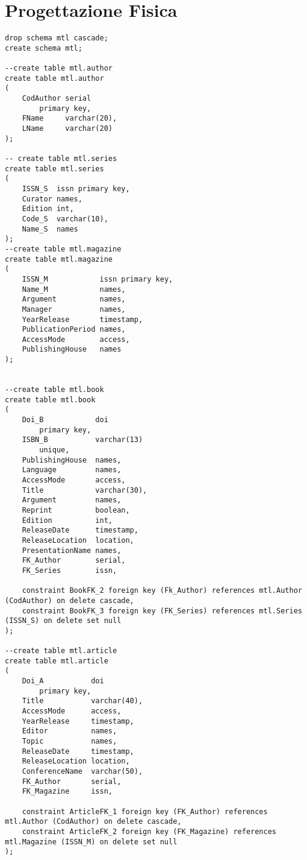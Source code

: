 \chapter{Progettazione Fisica}

\begin{lstlisting}
drop schema mtl cascade;
create schema mtl;

--create table mtl.author
create table mtl.author
(
    CodAuthor serial
        primary key,
    FName     varchar(20),
    LName     varchar(20)
);

-- create table mtl.series
create table mtl.series
(
    ISSN_S  issn primary key,
    Curator names,
    Edition int,
    Code_S  varchar(10),
    Name_S  names
);
--create table mtl.magazine
create table mtl.magazine
(
    ISSN_M            issn primary key,
    Name_M            names,
    Argument          names,
    Manager           names,
    YearRelease       timestamp,
    PublicationPeriod names,
    AccessMode        access,
    PublishingHouse   names
);


--create table mtl.book
create table mtl.book
(
    Doi_B            doi
        primary key,
    ISBN_B           varchar(13)
        unique,
    PublishingHouse  names,
    Language         names,
    AccessMode       access,
    Title            varchar(30),
    Argument         names,
    Reprint          boolean,
    Edition          int,
    ReleaseDate      timestamp,
    ReleaseLocation  location,
    PresentationName names,
    FK_Author        serial,
    FK_Series        issn,

    constraint BookFK_2 foreign key (Fk_Author) references mtl.Author (CodAuthor) on delete cascade,
    constraint BookFK_3 foreign key (FK_Series) references mtl.Series (ISSN_S) on delete set null
);

--create table mtl.article
create table mtl.article
(
    Doi_A           doi
        primary key,
    Title           varchar(40),
    AccessMode      access,
    YearRelease     timestamp,
    Editor          names,
    Topic           names,
    ReleaseDate     timestamp,
    ReleaseLocation location,
    ConferenceName  varchar(50),
    FK_Author       serial,
    FK_Magazine     issn,

    constraint ArticleFK_1 foreign key (FK_Author) references mtl.Author (CodAuthor) on delete cascade,
    constraint ArticleFK_2 foreign key (FK_Magazine) references mtl.Magazine (ISSN_M) on delete set null
);
\end{lstlisting}